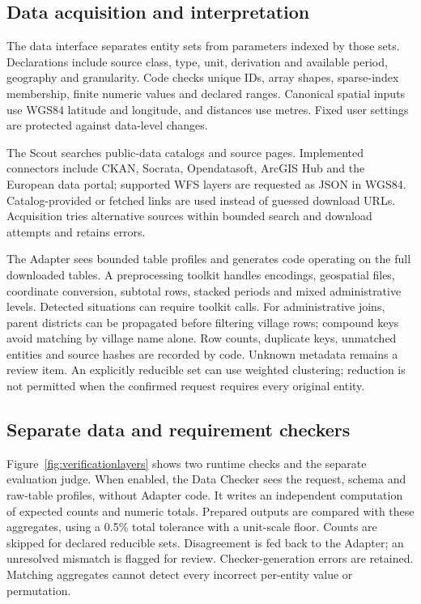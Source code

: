 \subsection{Data acquisition and interpretation}
The data interface separates entity sets from parameters indexed by those sets. Declarations include source
class, type, unit, derivation and available period, geography and granularity. Code checks unique IDs, array
shapes, sparse-index membership, finite numeric values and declared ranges. Canonical spatial inputs use WGS84
latitude and longitude, and distances use metres. Fixed user settings are protected against data-level changes.

The Scout searches public-data catalogs and source pages. Implemented connectors include CKAN, Socrata,
Opendatasoft, ArcGIS Hub and the European data portal; supported WFS layers are requested as JSON in WGS84.
Catalog-provided or fetched links are used instead of guessed download URLs. Acquisition tries alternative
sources within bounded search and download attempts and retains errors.

The Adapter sees bounded table profiles and generates code operating on the full downloaded tables.
A preprocessing toolkit handles encodings, geospatial files, coordinate conversion, subtotal rows, stacked
periods and mixed administrative levels. Detected situations can require toolkit calls. For administrative
joins, parent districts can be propagated before filtering village rows; compound keys avoid matching by village
name alone. Row counts, duplicate keys, unmatched entities and source hashes are recorded by code.
Unknown metadata remains a review item. An explicitly reducible set can use weighted clustering; reduction is
not permitted when the confirmed request requires every original entity.

\subsection{Separate data and requirement checkers}
\label{sec:checkers}
Figure~\ref{fig:verificationlayers} shows two runtime checks and the separate evaluation judge.
When enabled, the Data Checker sees the request, schema and raw-table profiles, without Adapter code. It writes
an independent computation of expected counts and numeric totals. Prepared outputs are compared with these
aggregates, using a 0.5\% total tolerance with a unit-scale floor. Counts are skipped for declared reducible sets.
Disagreement is fed back to the Adapter; an unresolved mismatch is flagged for review. Checker-generation errors
are retained. Matching aggregates cannot detect every incorrect per-entity value or permutation.

